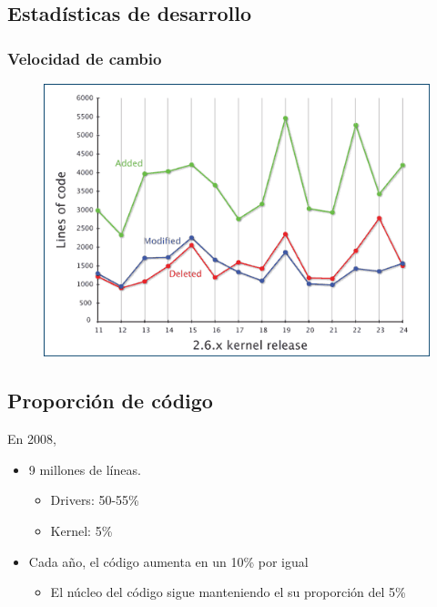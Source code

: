 \documentclass[spanish]{beamer}
\begin{document}
  \subsection{Estad\'{i}sticas de desarrollo}
  
  
  \frame
  {
    \frametitle{Velocidad de cambio}

    \begin{figure}
      \scalebox{0.35}
      {
        \includegraphics{img/figure5-rateofchange.png}
      }
    \end{figure}
  }

  \subsection{Proporción de código}
  En 2008,
  \begin{itemize}
    \item 9 millones de líneas.
      \begin{itemize}
        \item Drivers: 50-55\%
        \item Kernel: 5\%
      \end{itemize}
    \item Cada año, el código aumenta en un 10\% por igual
      \begin{itemize}
        \item El núcleo del código sigue manteniendo el su proporción del 5\%
      \end{itemize}
  \end{itemize}
\end{document}

